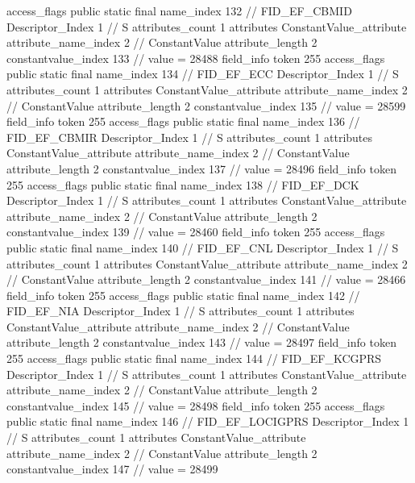 {{{{{				access_flags	public static final
				name_index	132		// FID_EF_CBMID
				Descriptor_Index	1		// S
				attributes_count	1
				attributes {
				ConstantValue_attribute {
					attribute_name_index	2		// ConstantValue
					attribute_length	2
					constantvalue_index	133		// value = 28488
				}
				}
			}
			field_info {
				token	255
				access_flags	public static final
				name_index	134		// FID_EF_ECC
				Descriptor_Index	1		// S
				attributes_count	1
				attributes {
				ConstantValue_attribute {
					attribute_name_index	2		// ConstantValue
					attribute_length	2
					constantvalue_index	135		// value = 28599
				}
				}
			}
			field_info {
				token	255
				access_flags	public static final
				name_index	136		// FID_EF_CBMIR
				Descriptor_Index	1		// S
				attributes_count	1
				attributes {
				ConstantValue_attribute {
					attribute_name_index	2		// ConstantValue
					attribute_length	2
					constantvalue_index	137		// value = 28496
				}
				}
			}
			field_info {
				token	255
				access_flags	public static final
				name_index	138		// FID_EF_DCK
				Descriptor_Index	1		// S
				attributes_count	1
				attributes {
				ConstantValue_attribute {
					attribute_name_index	2		// ConstantValue
					attribute_length	2
					constantvalue_index	139		// value = 28460
				}
				}
			}
			field_info {
				token	255
				access_flags	public static final
				name_index	140		// FID_EF_CNL
				Descriptor_Index	1		// S
				attributes_count	1
				attributes {
				ConstantValue_attribute {
					attribute_name_index	2		// ConstantValue
					attribute_length	2
					constantvalue_index	141		// value = 28466
				}
				}
			}
			field_info {
				token	255
				access_flags	public static final
				name_index	142		// FID_EF_NIA
				Descriptor_Index	1		// S
				attributes_count	1
				attributes {
				ConstantValue_attribute {
					attribute_name_index	2		// ConstantValue
					attribute_length	2
					constantvalue_index	143		// value = 28497
				}
				}
			}
			field_info {
				token	255
				access_flags	public static final
				name_index	144		// FID_EF_KCGPRS
				Descriptor_Index	1		// S
				attributes_count	1
				attributes {
				ConstantValue_attribute {
					attribute_name_index	2		// ConstantValue
					attribute_length	2
					constantvalue_index	145		// value = 28498
				}
				}
			}
			field_info {
				token	255
				access_flags	public static final
				name_index	146		// FID_EF_LOCIGPRS
				Descriptor_Index	1		// S
				attributes_count	1
				attributes {
				ConstantValue_attribute {
					attribute_name_index	2		// ConstantValue
					attribute_length	2
					constantvalue_index	147		// value = 28499
}}}}}}}
